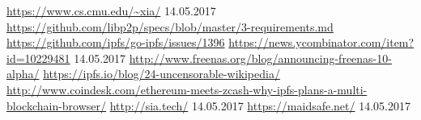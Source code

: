 \documentclass[a4paper,11pt, oneside]{report}
\theoremstyle{definition}
\begin{document}
\begin{thebibliography}{1}
 \url{https://www.cs.cmu.edu/~xia/} 14.05.2017
 \url{https://github.com/libp2p/specs/blob/master/3-requirements.md} 
 \url{https://github.com/ipfs/go-ipfs/issues/1396}
 \url{https://news.ycombinator.com/item?id=10229481} 14.05.2017
 \url{}
 \url{http://www.freenas.org/blog/announcing-freenas-10-alpha/}
 \url{https://ipfs.io/blog/24-uncensorable-wikipedia/}
 \url{http://www.coindesk.com/ethereum-meets-zcash-why-ipfs-plans-a-multi-blockchain-browser/}
 \url{http://sia.tech/}  14.05.2017
 \url{https://maidsafe.net/} 14.05.2017


\end{thebibliography}


\printglossaries

\listoffigures
\end{document}
